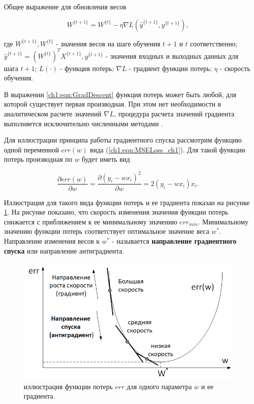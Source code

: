 \documentclass[12pt]{article}
\begin{document}
\begin{sloppypar}
Общее выражение для обновления весов

\begin{equation}
	\label{ch1:eqn:GradDescent}
	W^{\{t+1\}} = W^{\{t\}} - \eta \nabla L(\hat y^{\{t+1\}},y^{\{t+1\}}),
\end{equation}

где $W^{\{t+1\}}, W^{\{t\}}$  - значения весов на шаге обучения $t+1$ и $t$ соответственно; $\hat y^{\{t+1\}} = (W^{\{t\}})^TX^{\{t+1\}} , y^{\{t+1\}}$ - значения входных и выходных данных для шага $t+1$; $L(\cdot)$ - функция потерь; $\nabla L$ - градиент функции потерь; $\eta$ - скорость обучения. 

В выражении \ref{ch1:eqn:GradDescent} функция потерь может быть любой, для которой существует первая производная. При этом нет необходимости в аналитическом расчете  значений $\nabla L$, процедура расчета значений градиента выполняется исключительно численными методами
\cite{Nikolenko2017DL}.

Для иллюстрации принципа работы градиентного спуска рассмотрим функцию одной переменной $err(w)$ вида (\ref{ch1:eqn:MSELoss_ch1}). Для такой функции потерь производная по $w$ будет иметь вид 

\begin{equation}
\frac{\partial err(w)}{\partial w} = \frac{\partial (y_i-wx_i)^2}{\partial w}= 2(y_i-wx_i)x_i.
\end{equation}

Иллюстрация для такого вида функции потерь и ее градиента показан на рисунке \ref{ch1:fig:MSELoss_1_variable}. На рисунке показано, что скорость изменения значения функции потерь снижается с приближением к ее минимальному значению $err_{min}$. Минимальному значению функции потерь соответствует оптимальное значение веса $w^*$. Направление изменения весов к $w^*$ - называется \textbf{направление градиентного спуска} или  направление антиградиента.

\begin{figure}
    \begin{center}
		\includegraphics[width=0.8\linewidth]{./figuresch1/MSELoss_1_variable.png}
		\caption{иллюстрация функции потерь $err$ для одного параметра $w$ и ее градиента.}		
		\label{ch1:fig:MSELoss_1_variable}
	\end{center}	
\end{figure}


\end{sloppypar}
\end{document}

